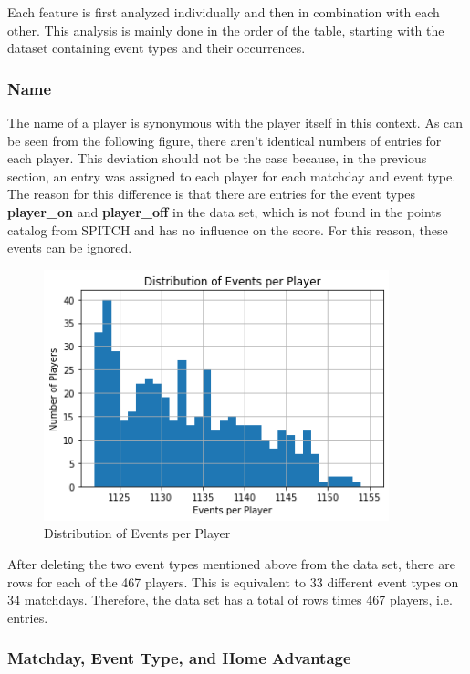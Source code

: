 Each feature is first analyzed individually and then in combination with each other. This analysis is mainly done in the order of the table, starting with the dataset containing event types and their occurrences.

\subsubsection{Name}

The name of a player is synonymous with the player itself in this context. As can be seen from the following figure, there aren't identical numbers of entries for each player. This deviation should not be the case because, in the previous section, an entry was assigned to each player for each matchday and event type. The reason for this difference is that there are entries for the event types \textbf{player\_on} and \textbf{player\_off} in the data set, which is not found in the points catalog from SPITCH and has no influence on the score. For this reason, these events can be ignored.

\begin{figure}[H]
    \centering
    \label{fig:distribution_of_events_per_player}
    \includegraphics[width=10cm]{chapter/4_implementation/section/2_data/section/figures/distribution_of_events_per_player.png}
    \captionsetup{justification=centering}
    \caption{Distribution of Events per Player}
\end{figure}

After deleting the two event types mentioned above from the data set, there are  rows for each of the 467 players. This is equivalent to 33 different event types on 34 matchdays. Therefore, the data set has a total of  rows times 467 players, i.e.  entries. 

 \clearpage \subsubsection{Matchday, Event Type, and Home Advantage}

